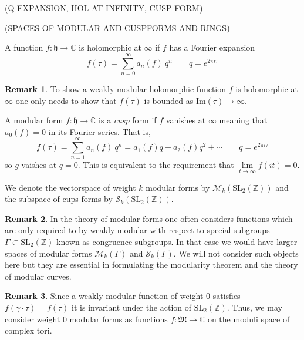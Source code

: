 \documentclass{article}
\newcommand{\SL}[0]{\mathrm{SL}}
\newcommand{\Z}{\mathbb{Z}}
\newcommand{\C}{\mathbb{C}}
\newcommand{\Imt}[0]{\mathrm{Im}}
\theoremstyle{definition}
\newtheorem{remark}{Remark}[section]
\newenvironment{definition}[1][Definition:]{\begin{trivlist}
\item[\hskip \labelsep {\bfseries #1}]}{\end{trivlist}}
\renewcommand{\S}[1]{\mathcal{S}_{#1}}
\newcommand{\M}[1]{\mathcal{M}_{#1}}
\newcommand{\h}{\mathfrak{h}}
\newcommand{\MG}{\SL_2(\Z)}
\begin{document}
(Q-EXPANSION, HOL AT INFINITY, CUSP FORM)

(SPACES OF MODULAR AND CUSPFORMS AND RINGS)

\begin{definition}
A function $f: \h \to \C$ is holomorphic at $\infty$ if $f$ has a Fourier expansion 
\[ f(\tau) = \sum_{n = 0}^{\infty} a_n(f) \: q^n \quad \quad  q = e^{2\pi i \tau} \]
\end{definition}


\begin{remark}
To show a weakly modular holomorphic function $f$ is holomorphic at $\infty$ one only needs to show that $f(\tau)$ is bounded as $\Imt(\tau) \to \infty$.
\end{remark}

\begin{definition}
A modular form $f : \h \to \C$ is a \textit{cusp} form if $f$ vanishes at $\infty$ meaning that $a_0(f) = 0$ in its Fourier series. That is,
\[ f(\tau) = \sum^\infty_{n = 1} a_n(f) \: q^n = a_1(f) q + a_2(f) q^2 + \cdots \quad \quad q = e^{2 \pi i \tau} \]
so $g$ vaishes at $q = 0$. This is equivalent to the requirement that $\lim\limits_{t \to \infty} f(i t) = 0$. 
\end{definition}


\begin{definition}
We denote the vectorspace of weight $k$ modular forms by $\M{k}(\MG)$ and the subspace of cups forms by $\S{k}(\MG)$. 
\end{definition}

\begin{remark}
In the theory of modular forms one often considers functions which are only required to by weakly modular with respect to special subgroups $\Gamma \subset \MG$ known as congruence subgroups. In that case we would have larger spaces of modular forms $\M{k}(\Gamma)$ and $\S{k}(\Gamma)$. We will not consider such objects here but they are essential in formulating the modularity theorem and the theory of modular curves. 
\end{remark}

\begin{remark}
Since a weakly modular function of weight $0$ satisfies $f(\gamma \cdot \tau) = f(\tau)$ it is invariant under the action of $\MG$. Thus, we may consider weight $0$ modular forms as functions $f : \mathfrak{M} \to \C$ on the moduli space of complex tori. 
\end{remark}
\end{document}
